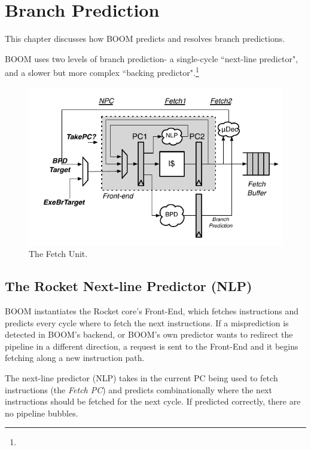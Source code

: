  
\chapter{Branch Prediction}\label{chapter:bpd}

This chapter discusses how BOOM predicts and resolves branch predictions.

BOOM uses two levels of branch prediction- a single-cycle ``next-line predictor", and a slower but more complex ``backing predictor".\footnote{}


\begin{figure}[ht]
	\centering
	\centerline{\includegraphics[scale =1] {figures/frontend}}
	\caption{ \small The Fetch Unit.}
	\label{fig:fetch}
\end{figure}


\section{The Rocket Next-line Predictor (NLP)}

BOOM instantiates the Rocket core's Front-End, which fetches instructions and predicts every cycle where to fetch the next instructions. If a misprediction is detected in BOOM's backend, or BOOM's own predictor wants to redirect the pipeline in a different direction, a request is sent to the Front-End and it begins fetching along a new instruction path. 

The next-line predictor (NLP) takes in the current PC being used to fetch instructions (the {\em Fetch PC}) and predicts combinationally where the next instructions should be fetched for the next cycle. If predicted correctly, there are no pipeline bubbles. 

